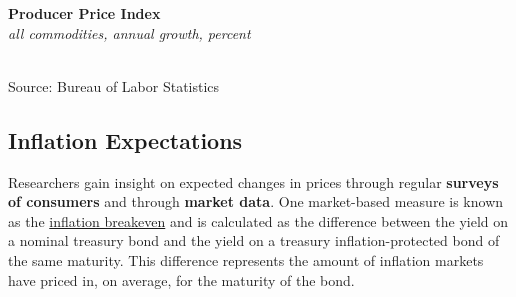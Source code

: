 \documentclass{report}
\makeatletter
\newcommand{\tbllink}[1]{\href{https://raw.githubusercontent.com/bdecon/US-chartbook/master/chartbook/data/#1}{\faTable}}
\newcommand*\short[1]{\expandafter\@gobbletwo\number\numexpr#1\relax}
\newcommand{\dateaxisticks}{
		date coordinates in=x, axis line style={draw=none},
		xmax={2020-05-10},
		max space between ticks=40,	    
		xtick={{1990-01-01}, {1992-01-01}, {1994-01-01}, 
			{1996-01-01}, {1998-01-01}, {2000-01-01}, 
			{2002-01-01}, {2004-01-01}, {2006-01-01},
			{2008-01-01}, {2010-01-01}, {2012-01-01}, {2014-01-01},
		    {2016-01-01}, {2018-01-01}, {2020-01-01}},
		minor xtick={{1989-01-01}, {1991-01-01}, {1993-01-01},
			{1995-01-01}, {1997-01-01}, {1999-01-01}, 
			{2001-01-01}, {2003-01-01}, {2005-01-01}, {2007-01-01},
		    {2009-01-01}, {2011-01-01}, {2013-01-01}, {2015-01-01},
		    {2017-01-01}, {2019-01-01}},
		enlarge y limits={0.06}, enlarge x limits={0.01},
		}
\newcommand{\bbar}[2]{extra #1 ticks = {{#2}}, extra #1 tick labels = ,
		extra #1 tick style = {grid=major, grid style={thick, black!25}},}
\newcommand{\stdline}[4]{\addplot[very thick, no markers, color=#1] 
		table [x=#2, y=#3, col sep=comma] {#4};	}
\newcommand{\rbars}{
		\fill[color=black!10] (axis cs:{1990-07-01},\pgfkeysvalueof{/pgfplots/ymin}) rectangle 
			(axis cs:{1991-03-01}, \pgfkeysvalueof{/pgfplots/ymax});
		\fill[color=black!10] (axis cs:{2007-12-01},\pgfkeysvalueof{/pgfplots/ymin}) rectangle 
			(axis cs:{2009-07-01}, \pgfkeysvalueof{/pgfplots/ymax});
		\fill[color=black!10] (axis cs:{2001-03-01},\pgfkeysvalueof{/pgfplots/ymin}) rectangle 
			(axis cs:{2001-11-01}, \pgfkeysvalueof{/pgfplots/ymax});}
\makeatother
\begin{document}
{{{{{{{{{\begin{minipage}{0.47\textwidth}
\noindent \normalsize \textbf{Producer Price Index}\\
\footnotesize{\textit{all commodities, annual growth, percent}}\\
\noindent \hspace*{-2mm} \\
\footnotesize{Source: Bureau of Labor Statistics} \hfill \tbllink{ppi.csv}
\end{minipage} \hspace{6mm} 
\begin{minipage}{0.24\textwidth}
\small 
\end{minipage}

\subsection*{\color{black!70} \seriffont Inflation Expectations}

\begin{minipage}{0.76\textwidth}

\small Researchers gain insight on expected changes in prices through regular \textbf{surveys of consumers} and through \textbf{market data}. One market-based measure is known as the \href{https://fred.stlouisfed.org/series/T5YIE}{inflation breakeven} and is calculated as the difference between the yield on a nominal treasury bond and the yield on a treasury inflation-protected bond of the same maturity. This difference represents the amount of inflation markets have priced in, on average, for the maturity of the bond.
\end{minipage}

}}}}}}}}}
\end{document}
